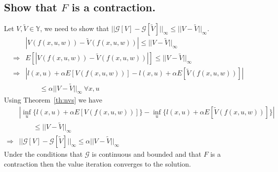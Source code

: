\subsection{Show that $F$ is a contraction.}%
\label{sec:showfcontraction}
Let $V,\tilde{V}\in\mathbb{Y}$, we need to show that $||\mathcal{G}[V]-\mathcal{G}[\tilde{V}]||_\infty \leq ||V-\tilde{V}||_\infty$.
\begin{align*}
&|V(f(x,u,w)) - \tilde{V}(f(x,u,w))| \leq ||V-\tilde{V}||_\infty \\
\Rightarrow &E[|V(f(x,u,w)) - \tilde{V}(f(x,u,w))|] \leq ||V-\tilde{V}||_\infty \\
\Rightarrow &|l(x,u)+\alpha E[V(f(x,u,w))] - l(x,u)+\alpha E[\tilde{V}(f(x,u,w))]| \\
&\qquad \leq \alpha||V-\tilde{V}||_\infty~\forall x,u
\end{align*}
Using Theorem~\ref{th:nvs} we have
\begin{align*}
&|\inf_u\{l(x,u)+\alpha E[V(f(x,u,w))]\} - \inf_u\{l(x,u)+\alpha E[\tilde{V}(f(x,u,w))]\}| \\
&\qquad \leq ||V-\tilde{V}||_\infty \\
\Rightarrow &||\mathcal{G}[V]-\mathcal{G}[\tilde{V}]||_\infty \leq \alpha||V-\tilde{V}||_\infty
\end{align*}
Under the conditions that $\mathcal{G}$ is continuous and bounded and that $F$ is a contraction then the value iteration converges to the solution.

